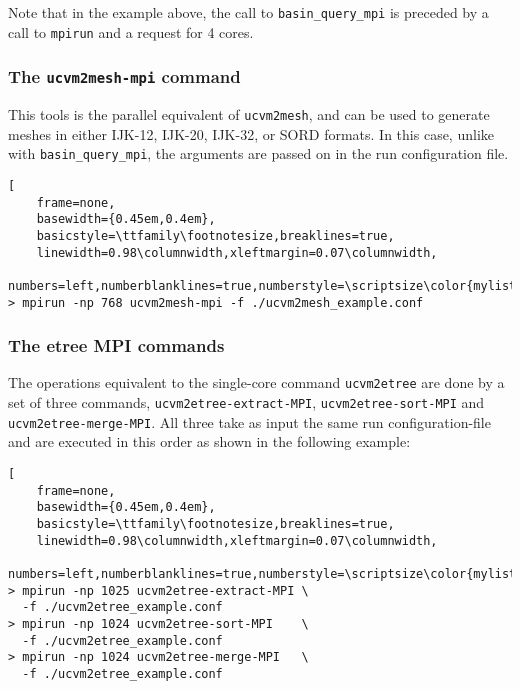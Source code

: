 Note that in the example above, the call to \texttt{basin\_query\_mpi} is preceded by a call to \texttt{mpirun} and a request for 4 cores.

\subsubsection{The \textup{\texttt{ucvm2mesh-mpi}} command}

This tools is the parallel equivalent of \texttt{ucvm2mesh}, and can be used to generate meshes in either IJK-12, IJK-20, IJK-32, or SORD formats. In this case, unlike with \texttt{basin\_query\_mpi}, the arguments are passed on in the run configuration file.

\begin{lstlisting}[
	frame=none,
	basewidth={0.45em,0.4em},
	basicstyle=\ttfamily\footnotesize,breaklines=true,
	linewidth=0.98\columnwidth,xleftmargin=0.07\columnwidth,
	numbers=left,numberblanklines=true,numberstyle=\scriptsize\color{mylistingnclr}]
> mpirun -np 768 ucvm2mesh-mpi -f ./ucvm2mesh_example.conf
\end{lstlisting}

\subsubsection{The etree MPI commands}

The operations equivalent to the single-core command \texttt{ucvm2etree} are done by a set of three commands, \texttt{ucvm2etree-extract-MPI}, \texttt{ucvm2etree-sort-MPI} and \texttt{ucvm2etree-merge-MPI}. All three take as input the same run configuration-file and are executed in this order as shown in the following example:

\begin{lstlisting}[
	frame=none,
	basewidth={0.45em,0.4em},
	basicstyle=\ttfamily\footnotesize,breaklines=true,
	linewidth=0.98\columnwidth,xleftmargin=0.07\columnwidth,
	numbers=left,numberblanklines=true,numberstyle=\scriptsize\color{mylistingnclr}]
> mpirun -np 1025 ucvm2etree-extract-MPI \
  -f ./ucvm2etree_example.conf
> mpirun -np 1024 ucvm2etree-sort-MPI    \
  -f ./ucvm2etree_example.conf
> mpirun -np 1024 ucvm2etree-merge-MPI   \
  -f ./ucvm2etree_example.conf
\end{lstlisting}

